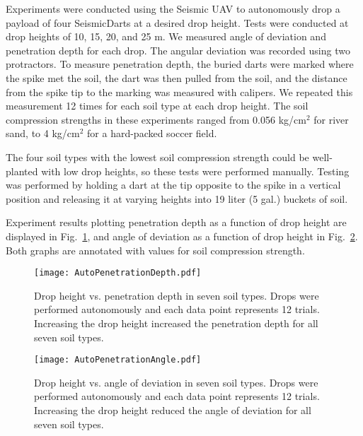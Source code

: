  Experiments were conducted using the Seismic UAV to autonomously drop a payload of four SeismicDarts at a desired drop height. 
 Tests were conducted at drop heights of 10, 15, 20, and 25 m. 
 We measured angle of deviation and penetration depth for each drop.
 The angular deviation was recorded using two protractors.
 To measure penetration depth, the buried darts were marked where the spike met the soil, the dart was then pulled from the soil, and the distance from the spike tip to the marking was measured with calipers. 
  We repeated this measurement 12 times for each soil type at each drop height.  The soil compression strengths in these experiments ranged from 0.056 kg/cm$^2$ for river sand, to 4 kg/cm$^2$ for a hard-packed soccer field.

The four soil types with the lowest soil compression strength could be well-planted with low drop heights, so these tests were performed manually.
   Testing was performed by holding a dart at the tip opposite to the spike in a vertical position and releasing it at varying heights into 19 liter (5 gal.) buckets of soil. 


 
Experiment results plotting penetration depth as a function of drop height are displayed in Fig.~\ref{fig:DepthPlotIndoors}, and angle of deviation as a function of drop height in Fig.~\ref{fig:AnglePlotIndoors}.   Both graphs are annotated with values for soil compression strength. 

\begin{figure} \centering
{\texttt{[image: AutoPenetrationDepth.pdf]}}
\caption{Drop height vs. penetration depth in seven soil types. Drops were performed autonomously and each data point represents 12 trials. Increasing the drop height increased the penetration depth for all seven soil types.} 
\label{fig:DepthPlotIndoors}
\end{figure}

\begin{figure} \centering
{\texttt{[image: AutoPenetrationAngle.pdf]}}
\caption{Drop height vs. angle of deviation in seven soil types. Drops were performed autonomously and each data point represents 12 trials. Increasing the drop height reduced the angle of deviation for all seven soil types.} 
\label{fig:AnglePlotIndoors}
\vspace{-1em}
\end{figure}

